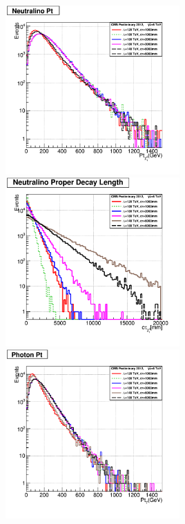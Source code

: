 \paragraph*{}\mbox{}\\
\begin{minipage}{\linewidth} 
\begin{center}
\centering
\mbox{\includegraphics[height=0.5\textwidth,width=0.5\textwidth]{THESISPLOTS/GMSB-SPS8-MODEL-Neutralinio-Pt.png} \hspace{-1cm}
\includegraphics[height=0.5\textwidth,width=0.5\textwidth]{THESISPLOTS/GMSB-SPS8-MODEL-Neutralino-Proper-DecayLength.png}} \\
\hspace{0.5cm}
\mbox{\includegraphics[height=0.5\textwidth,width=0.5\textwidth]{THESISPLOTS/GMSB-SPS8-MODEL-Photon-Pt.png}}
\label{fig:NKINE}
\end{center}
\end{minipage}
